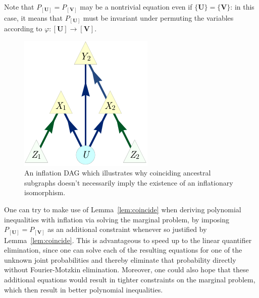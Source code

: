 

Note that $P_{[\bm{U}]} = P_{[\bm{V}]}$ may be a nontrivial equation even if $\{\bm{U}\}=\{\bm{V}\}$: in this case, it means that $P_{[\bm{U}]}$ must be invariant under permuting the variables according to $\varphi:[\bm{U}]\to[\bm{V}]$.

\begin{figure}[H]
    \centering
    \begin{minipage}[t]{0.6\linewidth}      \centering
    \includegraphics[scale=1]{instrumentalvariant.pdf}
    \caption{An inflation DAG which illustrates why coinciding ancestral subgraphs doesn't necessarily imply the existence of an inflationary isomorphism.}
    \label{fig:ancestralsubgraphnotenough}
    \end{minipage}
\end{figure}


One can try to make use of Lemma~\ref{lem:coincide} when deriving polynomial inequalities with inflation via solving the marginal problem, by imposing $P_{[\bm{U}]} = P_{[\bm{V}]}$ as an additional constraint whenever so justified by Lemma~\ref{lem:coincide}.
This is advantageous to speed up to the linear quantifier elimination, since one can solve each of the resulting equations for one of the unknown joint probabilities and thereby eliminate that probability directly without Fourier-Motzkin elimination. Moreover, one could also hope that these additional equations would result in tighter constraints on the marginal problem, which then result in better polynomial inequalities.

